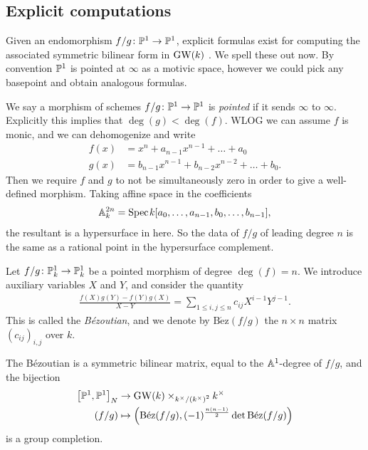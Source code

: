 \documentclass[11pt,openany]{book}
\providecommand{\Bez}{\mathrm{B\acute{e}z}}
\begin{document}
\subsection{Explicit computations}
Given an endomorphism $f/g \colon \P^1\to \P^1$, explicit formulas exist for computing the associated symmetric bilinear form in $\GW(k)$ \cite{Cazanave}. We spell these out now. By convention $\P^1$ is pointed at $\infty$ as a motivic space, however we could pick any basepoint and obtain analogous formulas.

\begin{note} We say a morphism of schemes $f/g \colon \P^1 \to \P^1$ is \textit{pointed} if it sends $\infty$ to $\infty$. Explicitly this implies that $\deg(g) < \deg(f)$. WLOG we can assume $f$ is monic, and we can dehomogenize and write
\begin{align*}
    f(x) &= x^n + a_{n-1} x^{n-1} + \ldots + a_0 \\
    g(x) &= b_{n-1}x^{n-1} + b_{n-2}x^{n-2} + \ldots + b_0.
\end{align*}
Then we require $f$ and $g$ to not be simultaneously zero in order to give a well-defined morphism. Taking affine space in the coefficients
\begin{align*}
    \A_k^{2n} = \Spec k[a_0, \ldots, a_{n-1},b_0, \ldots, b_{n-1}],
\end{align*}
the resultant is a hypersurface in here. So the data of $f/g$ of leading degree $n$ is the same as a rational point in the hypersurface complement.
\end{note}


\begin{definition} Let $f/g \colon \P_k^1 \to \P_k^1$ be a pointed morphism of degree $\deg(f) = n$. We introduce auxiliary variables $X$ and $Y$, and consider the quantity
\begin{align*}
    \frac{f(X)g(Y) - f(Y)g(X)}{X-Y} = \sum_{1\le i,j\le n} c_{ij} X^{i-1}Y^{j-1}.
\end{align*}
This is called the \textit{B\'ezoutian}, and we denote by $\Bez(f/g)$ the $n \times n$ matrix $(c_{ij})_{i,j}$ over $k$.
\end{definition}

\begin{theorem} The B\'{e}zoutian is a symmetric bilinear matrix, equal to the $\A^1$-degree of $f/g$, and the bijection
\begin{align*}
    \left[ \P^1,\P^1 \right]_N &\to \GW(k) \times_{k^\times / \left( k^\times \right)^2} k^\times \\
    (f/g) &\mapsto \left( \Bez(f/g), (-1)^{\frac{n(n-1)}{2}} \det \Bez(f/g) \right)
\end{align*}
is a group completion.
\end{theorem}
\end{document}
